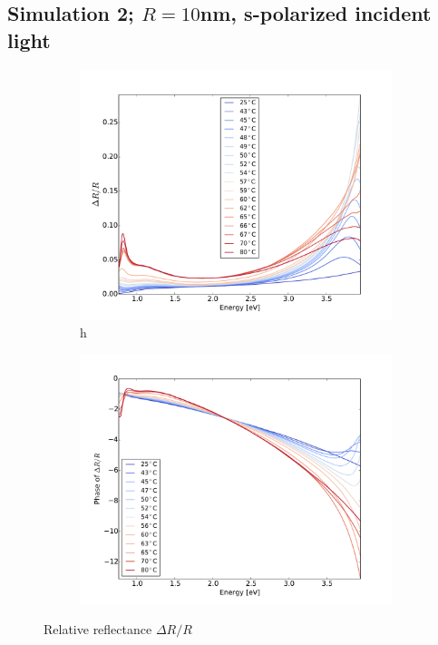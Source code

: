 \subsection{Simulation 2; $R = 10$nm, s-polarized incident light}
%
\begin{figure}
    \centering
    \begin{subfigure}[b]{0.49\textwidth}
        \centering
        \includegraphics[width=\textwidth]{Results/Sim2/dR.pdf}h
        \caption{}
        \label{fig:}
    \end{subfigure}
    \begin{subfigure}[b]{0.49\textwidth}
        \centering
        \includegraphics[width=\textwidth]{Results/Sim2/dRphase.pdf}
        \caption{}
        \label{fig:}
    \end{subfigure}
    \caption{Relative reflectance $\Delta R/R$}
    \label{fig:1}
\end{figure}
